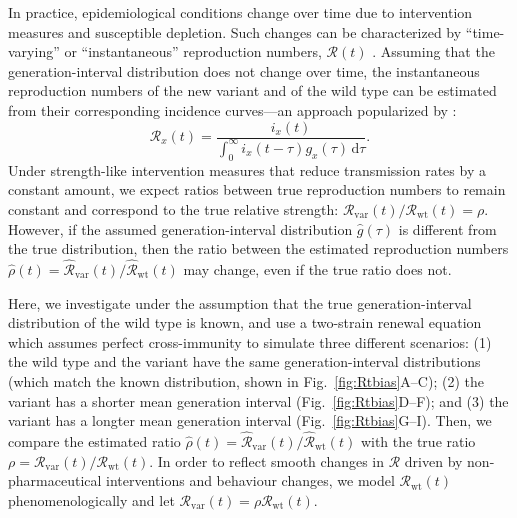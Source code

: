 \documentclass[12pt]{article}
\newcommand{\fref}[1]{Fig.~\ref{fig:#1}}
\newcommand{\vvvar}{\mathrm{var}}
\newcommand{\wwwt}{\mathrm{wt}}
\newcommand{\Rx}[1]{\ensuremath{{\mathcal R}_{#1}}\xspace}
\newcommand{\RR}{\ensuremath{{\mathcal R}}\xspace}
\newcommand{\Rw}{\Rx{\wwwt}}
\newcommand{\Rv}{\Rx{\vvvar}}
\newcommand{\dd}[1]{\ensuremath{\, \mathrm{d}#1}}
\newcommand{\dtau}{\dd{\tau}}
\begin{document}
In practice, epidemiological conditions change over time due to intervention measures and susceptible depletion.
Such changes can be characterized by ``time-varying'' or ``instantaneous'' reproduction numbers, $\RR(t)$ \citep{fraser2007estimating}.
Assuming that the generation-interval distribution does not change over time, the instantaneous reproduction numbers of the new variant and of the wild type can be estimated from their corresponding incidence curves---an approach popularized by \cite{cori2013new}:
\begin{equation}
\RR_x(t) = \frac{i_x(t)}{\int_0^\infty i_x(t-\tau) g_x(\tau) \dtau}.
\end{equation}
Under strength-like intervention measures that reduce transmission rates by a constant amount, we expect ratios between true reproduction numbers to remain constant and correspond to the true relative strength: $\Rv(t)/\Rw(t) = \rho$.
However, if the assumed generation-interval distribution $\hat{g}(\tau)$ is different from the true distribution, then the ratio between the estimated reproduction numbers $\hat{\rho}(t) = \hat{\RR}_{\textrm{var}}(t)/\hat{\RR}_{\textrm{wt}}(t)$ may change, even if the true ratio does not.

Here, we investigate under the assumption that the true generation-interval distribution of the wild type is known, and use a two-strain renewal equation which assumes perfect cross-immunity to simulate three different scenarios:  
(1) the wild type and the variant have the same generation-interval distributions (which match the known distribution, shown in \fref{Rtbias}A--C);
(2) the variant has a shorter mean generation interval (\fref{Rtbias}D--F); and
(3) the variant has a longter mean generation interval (\fref{Rtbias}G--I).
Then, we compare the estimated ratio $\hat{\rho}(t) = \hat{\RR}_{\textrm{var}}(t)/\hat{\RR}_{\textrm{wt}}(t)$ with the true ratio $\rho = \Rv(t)/\Rw(t)$.
In order to reflect smooth changes in $\RR$ driven by non-pharmaceutical interventions and behaviour changes, we model $\Rw(t)$ phenomenologically and let $\Rv(t) = \rho \Rw(t)$.
\end{document}
